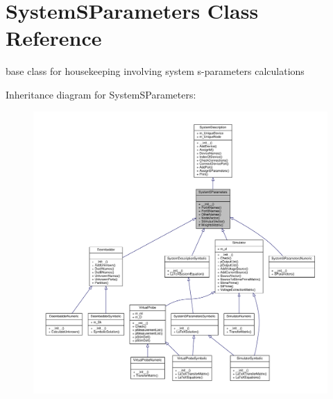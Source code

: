 \hypertarget{classSignalIntegrity_1_1SystemDescriptions_1_1SystemSParameters_1_1SystemSParameters}{}\section{System\+S\+Parameters Class Reference}
\label{classSignalIntegrity_1_1SystemDescriptions_1_1SystemSParameters_1_1SystemSParameters}


base class for housekeeping involving system s-\/parameters calculations  




Inheritance diagram for System\+S\+Parameters\+:
\nopagebreak
\begin{figure}[H]
\begin{center}
\leavevmode
\includegraphics[width=350pt]{classSignalIntegrity_1_1SystemDescriptions_1_1SystemSParameters_1_1SystemSParameters__inherit__graph}
\end{center}
\end{figure}


